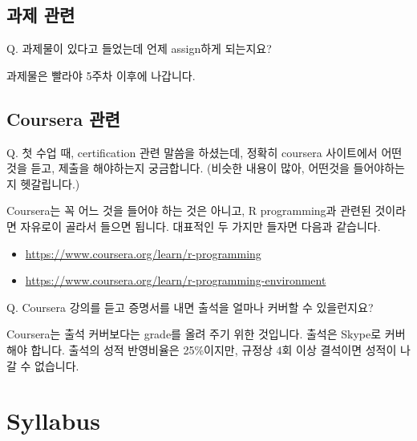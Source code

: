 \documentclass[11pt,]{krantz}
\providecommand{\tightlist}{%
  \setlength{\itemsep}{0pt}\setlength{\parskip}{0pt}}
\renewenvironment{quote}{\begin{VF}}{\end{VF}}
\theoremstyle{definition}
\theoremstyle{definition}
\theoremstyle{remark}
\begin{document}
\subsection*{과제 관련}\label{-}


\begin{quote}
Q. 과제물이 있다고 들었는데 언제 assign하게 되는지요?
\end{quote}

과제물은 빨라야 5주차 이후에 나갑니다.

\subsection*{Coursera 관련}\label{coursera-}


\begin{quote}
Q. 첫 수업 때, certification 관련 말씀을 하셨는데, 정확히 coursera
사이트에서 어떤 것을 듣고, 제출을 해야하는지 궁금합니다. (비슷한 내용이
많아, 어떤것을 들어야하는지 헷갈립니다.) 
\end{quote}

Coursera는 꼭 어느 것을 들어야 하는 것은 아니고, R programming과 관련된
것이라면 자유로이 골라서 들으면 됩니다. 대표적인 두 가지만 들자면 다음과
같습니다.

\begin{itemize}
\tightlist
\item
  \url{https://www.coursera.org/learn/r-programming}
\item
  \url{https://www.coursera.org/learn/r-programming-environment}
\end{itemize}

\begin{quote}
Q. Coursera 강의를 듣고 증명서를 내면 출석을 얼마나 커버할 수
있을런지요?
\end{quote}

Coursera는 출석 커버보다는 grade를 올려 주기 위한 것입니다. 출석은
Skype로 커버해야 합니다. 출석의 성적 반영비율은 25\%이지만, 규정상 4회
이상 결석이면 성적이 나갈 수 없습니다.

\section*{Syllabus}\label{syllabus}
\end{document}

